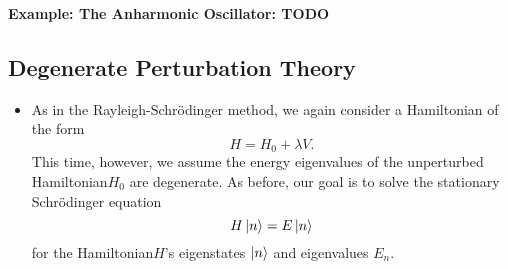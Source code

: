 \documentclass[11pt, a4paper]{article}
\newcommand{\Schro}{Schr\"{o}dinger\xspace}
\newcommand{\Ham}{Hamiltonian\xspace}
\begin{document}
\textbf{Example: The Anharmonic Oscillator: TODO}

\subsection{Degenerate Perturbation Theory}

\begin{itemize}
    \item As in the Rayleigh-\Schro method, we again consider a \Ham of the form
    \begin{equation*}
        H = H_{0} + \lambda V.
    \end{equation*}
    This time, however, we assume the energy eigenvalues of the unperturbed \Ham $ H_{0} $ are degenerate. As before, our goal is to solve the stationary \Schro equation
    \begin{equation*}
        H \ket{n} = E \ket{n}
    \end{equation*}
    for the \Ham $ H $'s eigenstates $ \ket{n} $ and eigenvalues $ E_{n} $. 
\end{itemize}
\end{document}
